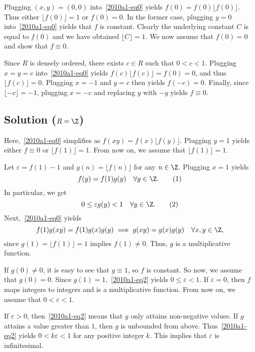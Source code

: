 Plugging $(x, y) = (0, 0)$ into~\eqref{2010a1-eq0} yields $f(0) = f(0) \lfloor f(0) \rfloor$.
Thus either $\lfloor f(0) \rfloor = 1$ or $f(0) = 0$.
In the former case, plugging $y = 0$ into~\eqref{2010a1-eq0} yields that $f$ is constant.
Clearly the underlying constant $C$ is equal to $f(0)$ and we have obtained $\lfloor C \rfloor = 1$.
We now assume that $f(0) = 0$ and show that $f \equiv 0$.

Since $R$ is densely ordered, there exists $c \in R$ such that $0 < c < 1$.
Plugging $x = y = c$ into~\eqref{2010a1-eq0} yields $f(c) \lfloor f(c) \rfloor = f(0) = 0$, and thus $\lfloor f(c) \rfloor = 0$.
Plugging $x = -1$ and $y = c$ then yields $f(-c) = 0$.
Finally, since $\lfloor -c \rfloor = -1$, plugging $x = -c$ and replacing $y$ with $-y$ yields $f \equiv 0$.





\subsection*{Solution ($R = \Z$)}

Here,~\eqref{2010a1-eq0} simplifies as $f(xy) = f(x) \lfloor f(y) \rfloor$.
Plugging $y = 1$ yields either $f \equiv 0$ or $\lfloor f(1) \rfloor = 1$.
From now on, we assume that $\lfloor f(1) \rfloor = 1$.

Let $\varepsilon = f(1) - 1$ and $g(n) = \lfloor f(n) \rfloor$ for any $n \in \Z$.
Plugging $x = 1$ yields
\[ f(y) = f(1) g(y) \quad \forall y \in \Z. \tag{1}\label{2010a1-eq1} \]
In particular, we get
\[ 0 \leq \varepsilon g(y) < 1 \quad \forall y \in \Z. \tag{2}\label{2010a1-eq2} \]
Next,~\eqref{2010a1-eq0} yields
\[ f(1) g(xy) = f(1) g(x) g(y) \implies g(xy) = g(x) g(y) \quad \forall x, y \in \Z, \]
    since $g(1) = \lfloor f(1) \rfloor = 1$ implies $f(1) \neq 0$.
Thus, $g$ is a multiplicative function.

If $g(0) \neq 0$, it is easy to see that $g \equiv 1$, so $f$ is constant.
So now, we assume that $g(0) = 0$.
Since $g(1) = 1$,~\eqref{2010a1-eq2} yields $0 \leq \varepsilon < 1$.
If $\varepsilon = 0$, then $f$ maps integers to integers and is a multiplicative function.
From now on, we assume that $0 < \varepsilon < 1$.

If $\varepsilon > 0$, then~\eqref{2010a1-eq2} means that $g$ only attains non-negative values.
If $g$ attains a value greater than $1$, then $g$ is unbounded from above.
Thus~\eqref{2010a1-eq2} yields $0 < k \varepsilon < 1$ for any positive integer $k$.
This implies that $\varepsilon$ is infinitesimal.

